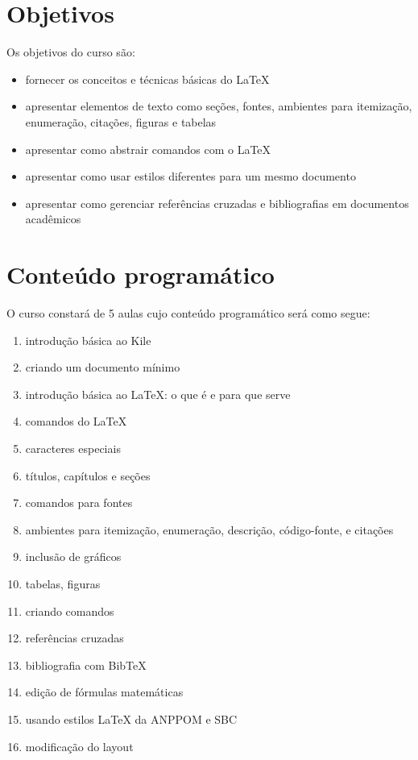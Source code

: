 \documentclass[12pt,brazil]{article}
\begin{document}
\section{Objetivos}

Os objetivos do curso são:

\begin{itemize}
\item fornecer os conceitos e técnicas básicas do \LaTeX
\item apresentar elementos de texto como seções, fontes, ambientes
  para itemização, enumeração, citações, figuras e tabelas
\item apresentar como abstrair comandos com o \LaTeX
\item apresentar como usar estilos diferentes para um mesmo documento
\item apresentar como gerenciar referências cruzadas e bibliografias
  em documentos acadêmicos
\end{itemize}

\section{Conteúdo programático} 

O curso constará de 5 aulas cujo conteúdo programático será como
segue:

\begin{enumerate}
\item introdução básica ao Kile
\item criando um documento mínimo
\item introdução básica ao LaTeX: o que é e para que serve
\item comandos do LaTeX
\item caracteres especiais
\item títulos, capítulos e seções
\item comandos para fontes
\item ambientes para itemização, enumeração, descrição, código-fonte, e citações
\item inclusão de gráficos
\item tabelas, figuras
\item criando comandos
\item referências cruzadas
\item bibliografia com BibTeX
\item edição de fórmulas matemáticas
\item usando estilos LaTeX da ANPPOM e SBC
\item modificação do layout
\end{enumerate} 
\end{document}
